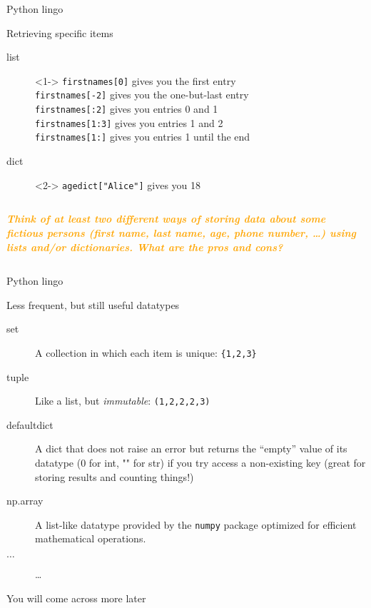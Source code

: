 \documentclass{beamer}
\newcommand{\question}[1]{
	\begin{frame}[plain]
		\begin{columns}
			\column{.3\textwidth}
			\makebox[\columnwidth]{
				\texttt{[image: mannetje.png]}}
			\column{.7\textwidth}
			\large
			\textcolor{orange}{\textbf{\emph{#1}}}
		\end{columns}
\end{frame}}
\begin{document}
	
	\begin{frame}{Python lingo}
		\begin{block}{Retrieving specific items}
			\begin{description}
				\item[{\color{red}list}]<1-> \texttt{firstnames[0]} gives you the first entry\\ 
				\texttt{firstnames[-2]} gives you the one-but-last entry\\
				\texttt{firstnames[:2]} gives you entries 0 and 1\\
				\texttt{firstnames[1:3]} gives you entries 1 and 2\\
				\texttt{firstnames[1:]} gives you entries 1 until the end\\
				\item[{\color{red}dict}]<2-> \texttt{agedict["Alice"]} gives you 18 
			\end{description}
			
		\end{block}
	\end{frame}
	
	
	\question{Think of at least two different ways of storing data about some fictious persons (first name, last name, age, phone number, \ldots) using lists and/or dictionaries. What are the pros and cons?}
	
	
	\begin{frame}{Python lingo}
		\begin{block}{Less frequent, but still useful datatypes}
			\begin{description}
				\item[{\color{red}set}]A collection in which each item is unique: \texttt{\{1,2,3\}}
				\item[{\color{red}tuple}]Like a list, but \emph{immutable}: \texttt{(1,2,2,2,3)}
				\item[{\color{red}defaultdict}]A dict that does not raise an error but returns the ``empty'' value of its datatype (0 for int, "" for str) if you try access a non-existing key (great for storing results and counting things!)
				\item[{\color{red}np.array}]A list-like datatype provided by the \texttt{numpy} package optimized for efficient mathematical operations.
				\item[$\ldots$]\ldots
			\end{description}
		\end{block}
		\small{You will come across more later}
	\end{frame}
	
\end{document}
